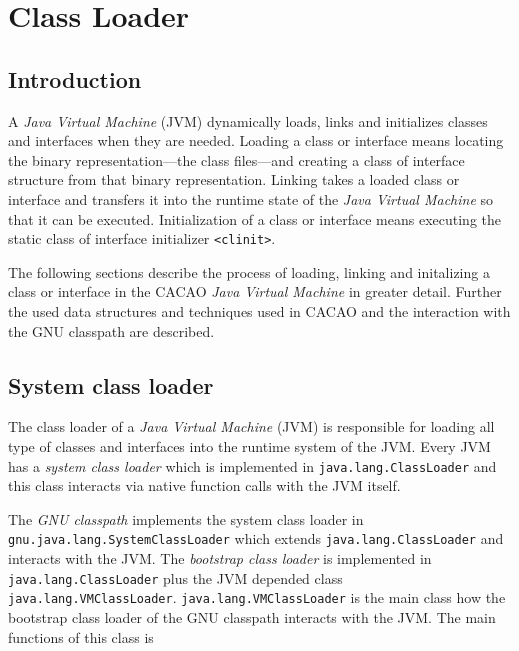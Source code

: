 \chapter{Class Loader}


\section{Introduction}

A \textit{Java Virtual Machine} (JVM) dynamically loads, links and
initializes classes and interfaces when they are needed. Loading a
class or interface means locating the binary representation---the
class files---and creating a class of interface structure from that
binary representation. Linking takes a loaded class or interface and
transfers it into the runtime state of the \textit{Java Virtual
Machine} so that it can be executed. Initialization of a class or
interface means executing the static class of interface initializer
\texttt{<clinit>}.

The following sections describe the process of loading, linking and
initalizing a class or interface in the CACAO \textit{Java Virtual
Machine} in greater detail. Further the used data structures and
techniques used in CACAO and the interaction with the GNU classpath
are described.


\section{System class loader}
\label{sectionsystemclassloader}

The class loader of a \textit{Java Virtual Machine} (JVM) is
responsible for loading all type of classes and interfaces into the
runtime system of the JVM. Every JVM has a \textit{system class
loader} which is implemented in \texttt{java.lang.ClassLoader} and
this class interacts via native function calls with the JVM itself.

\begingroup
{}
The \textit{GNU classpath} implements the system class loader in
\texttt{gnu.java.lang.SystemClassLoader} which extends
\texttt{java.lang.ClassLoader} and interacts with the JVM. The
\textit{bootstrap class loader} is implemented in
\texttt{java.lang.ClassLoader} plus the JVM depended class
\texttt{java.lang.VMClassLoader}. \texttt{java.lang.VMClassLoader} is
the main class how the bootstrap class loader of the GNU classpath
interacts with the JVM. The main functions of this class is

\endgroup

